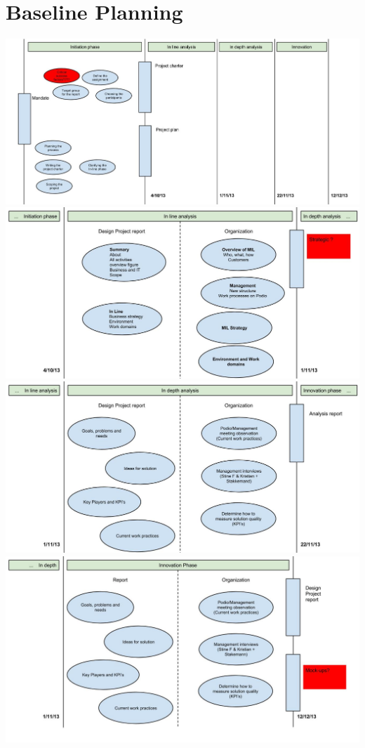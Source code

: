 \section{Baseline Planning}
\includegraphics[scale=0.5, angle=270]{Pictures/Baseline/BaselineInitiation.jpg}
\newpage
\includegraphics[scale=0.5, angle=270]{Pictures/Baseline/BaselineInLine.jpg}
\newpage
\includegraphics[scale=0.5, angle=270]{Pictures/Baseline/BaselineInDepth.jpg}
\newpage
\includegraphics[scale=0.5, angle=270]{Pictures/Baseline/BaselineInnovation.jpg}

